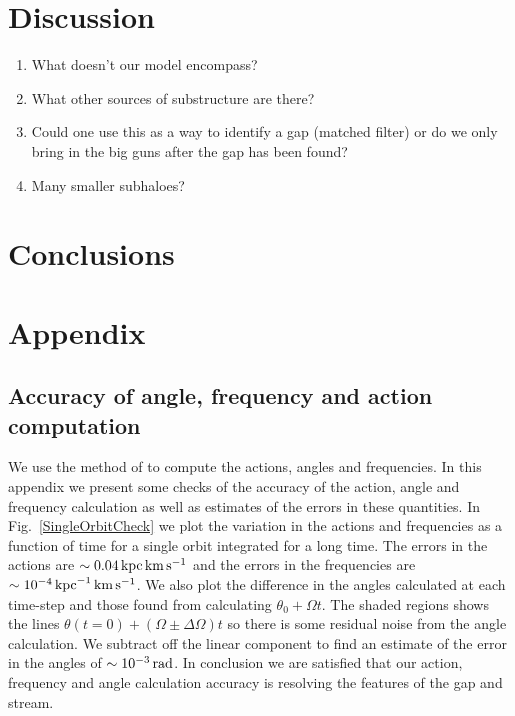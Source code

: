\documentclass[useAMS,usenatbib,fleqn,a4paper]{mn2e}
\def\kpc{\,{\rm kpc}}
\def\kms{\,{\rm km\,s^{-1}}}
\def\rad{\,\rm rad}
\begin{document}
\section{Discussion}
\begin{enumerate}
\item What doesn't our model encompass?
\item What other sources of substructure are there?
\item Could one use this as a way to identify a gap (matched filter) or do we only bring in the big guns after the gap has been found?
\item Many smaller subhaloes?
\end{enumerate}

\section{Conclusions}


\section*{Appendix}
\subsection{Accuracy of angle, frequency and action computation}
We use the method of \cite{SandersBinney2014} to compute the actions, angles and frequencies. In this appendix we present some checks of the accuracy of the action, angle and frequency calculation as well as estimates of the errors in these quantities. In Fig.~\ref{SingleOrbitCheck} we plot the variation in the actions and frequencies as a function of time for a single orbit integrated for a long time. The errors in the actions are $\sim0.04\kpc\kms$ and the errors in the frequencies are $\sim10^{-4}\kpc^{-1}\kms$. We also plot the difference in the angles calculated at each time-step and those found from calculating $\theta_0+\Omega t$. The shaded regions shows the lines $\theta(t=0)+(\Omega\pm\Delta\Omega)t$ so there is some residual noise from the angle calculation. We subtract off the linear component to find an estimate of the error in the angles of $\sim10^{-3}\rad$. In conclusion we are satisfied that our action, frequency and angle calculation accuracy is resolving the features of the gap and stream.
\end{document}
